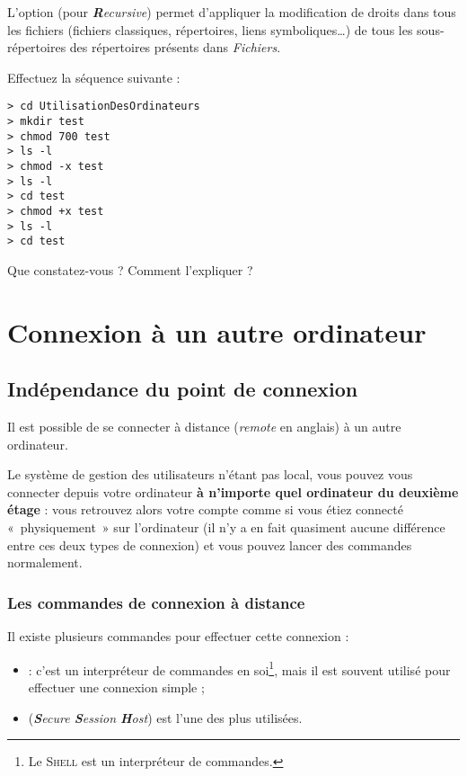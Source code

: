 \documentclass[11pt,a4paper]{article}
\newcommand{\shell}{\textsc{Shell}}
\begin{document}
L'option  (pour {\em {\bf R}ecursive}) permet d'appliquer
la modification de droits dans tous les fichiers (fichiers
classiques, répertoires, liens symboliques\ldots) de tous les
sous-répertoires des répertoires présents dans {\em
Fichiers}.

\begin{maw}[Travail]
Effectuez la séquence suivante :
\begin{verbatim}
> cd UtilisationDesOrdinateurs
> mkdir test
> chmod 700 test
> ls -l
> chmod -x test
> ls -l
> cd test
> chmod +x test
> ls -l
> cd test
\end{verbatim}
Que constatez-vous ? Comment l'expliquer ?
\end{maw}

\section{Connexion à un autre ordinateur}
\label{connexion}

\subsection{Indépendance du point de connexion}

Il est possible de se connecter à distance ({\em remote} en
anglais) à un autre ordinateur. %

Le système de gestion des utilisateurs n'étant pas local,
vous pouvez vous connecter depuis votre ordinateur {\bf à n'importe
quel ordinateur du deuxième étage} : vous
retrouvez alors votre compte comme si vous étiez connecté
«~physiquement~» sur l'ordinateur (il n'y a en fait
quasiment aucune différence entre ces deux types de connexion)
et vous pouvez lancer des commandes normalement.

\subsubsection{Les commandes de connexion à distance}

Il existe plusieurs commandes pour effectuer cette connexion :
\begin{itemize}
 \item {} : c'est un interpréteur de commandes en
       soi\footnote{Le \shell{} est un interpréteur de commandes.},
       mais il est souvent utilisé pour effectuer une connexion
       simple ;
 \item {} ({\em {\bf S}ecure {\bf S}ession {\bf H}ost}) est
       l'une des plus utilisées.
\end{itemize}
\end{document}
